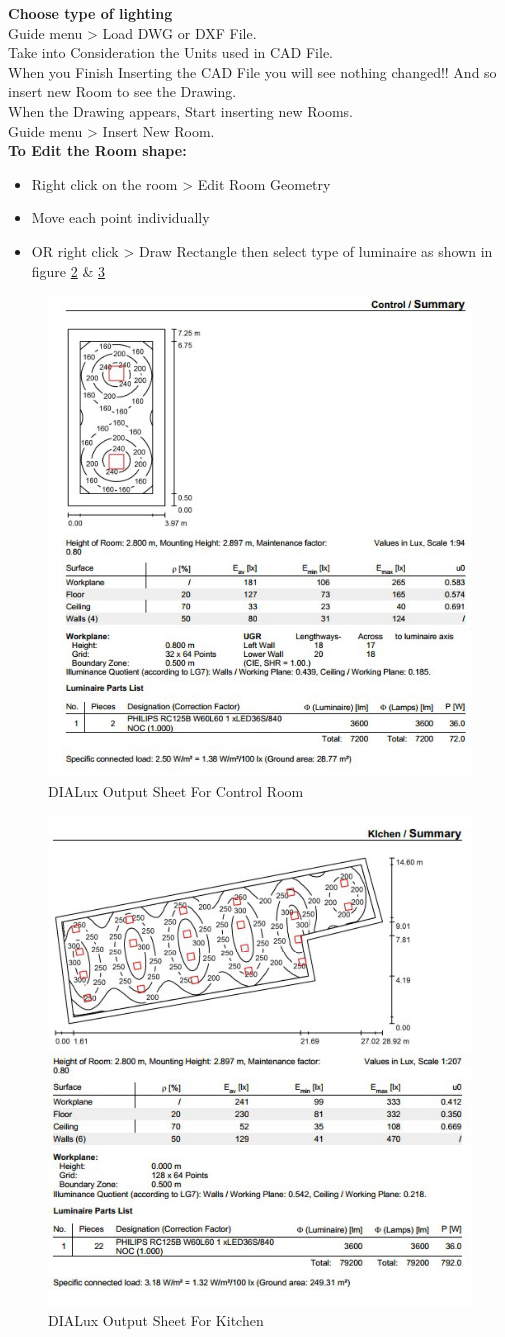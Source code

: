 \documentclass[12pt,fleqn]{book} %
\begin{document}
\begin{enumerate}
\begin{figure}[!h]
    \label{fig:fikry 21}
\end{figure}
\textbf{Choose type of lighting}
\\ Guide menu > Load DWG or DXF File.
\\ Take into Consideration the Units used in CAD File.
\\ When you Finish Inserting the CAD File you will see nothing changed!! And so insert new Room to see the Drawing.
\\ When the Drawing appears, Start inserting new Rooms.
\\ Guide menu > Insert New Room.
\\ \textbf{To Edit the Room shape:}
\begin{itemize}
    \item Right click on the room > Edit Room Geometry
    \item Move each point individually
    \item OR right click > Draw Rectangle then select type of luminaire as shown in figure \ref{fig:fikry 22} \& \ref{fig:fikry 23}
\end{itemize}
\begin{figure}[!h]
    \centering
    \includegraphics[width=0.5\linewidth]{fikry 22.png}
    \caption{DIALux Output Sheet For Control Room}
    \label{fig:fikry 22}
\end{figure}
\begin{figure}[!h]
    \centering
    \includegraphics[width=0.5\linewidth]{fikry 23.png}
    \caption{DIALux Output Sheet For Kitchen}
    \label{fig:fikry 23}
\end{figure}
\end{enumerate}
\newpage
\end{document}
